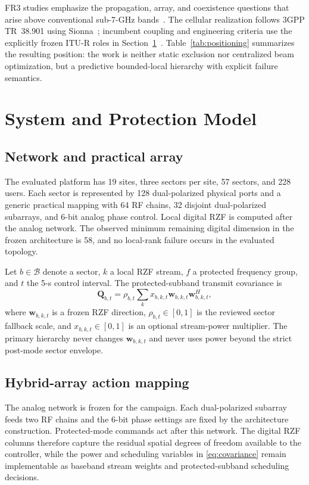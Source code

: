 \documentclass[journal]{IEEEtran}
\newcommand{\B}{\mathcal{B}}
\begin{document}
FR3 studies emphasize the propagation, array, and coexistence questions that arise above conventional sub-7-GHz bands~\cite{kang2024upper,chamberlain2024sharing}. The cellular realization follows 3GPP TR~38.901 using Sionna~\cite{3gpp38901,hoydis2022sionna}; incumbent coupling and engineering criteria use the explicitly frozen ITU-R roles in Section~\ref{sec:model}~\cite{iturp452,itursa1027,itursa509,iturf758}. Table~\ref{tab:positioning} summarizes the resulting position: the work is neither static exclusion nor centralized beam optimization, but a predictive bounded-local hierarchy with explicit failure semantics.



\section{System and Protection Model}
\label{sec:model}
\subsection{Network and practical array}
The evaluated platform has 19 sites, three sectors per site, 57 sectors, and 228 users. Each sector is represented by 128 dual-polarized physical ports and a generic practical mapping with 64 RF chains, 32 disjoint dual-polarized subarrays, and 6-bit analog phase control. Local digital RZF is computed after the analog network. The observed minimum remaining digital dimension in the frozen architecture is 58, and no local-rank failure occurs in the evaluated topology.

Let $b\in\B$ denote a sector, $k$ a local RZF stream, $f$ a protected frequency group, and $t$ the 5-s control interval. The protected-subband transmit covariance is
\begin{equation}
 \bm Q_{b,t}=\rho_{b,t}\sum_{k}x_{b,k,t}
 \bm w_{b,k,t}\bm w_{b,k,t}^{H},
 \label{eq:covariance}
\end{equation}
where $\bm w_{b,k,t}$ is a frozen RZF direction, $\rho_{b,t}\in[0,1]$ is the reviewed sector fallback scale, and $x_{b,k,t}\in[0,1]$ is an optional stream-power multiplier. The primary hierarchy never changes $\bm w_{b,k,t}$ and never uses power beyond the strict post-mode sector envelope.


\subsection{Hybrid-array action mapping}
The analog network is frozen for the campaign. Each dual-polarized subarray feeds two RF chains and the 6-bit phase settings are fixed by the architecture construction. Protected-mode commands act after this network. The digital RZF columns therefore capture the residual spatial degrees of freedom available to the controller, while the power and scheduling variables in \eqref{eq:covariance} remain implementable as baseband stream weights and protected-subband scheduling decisions.
\end{document}
